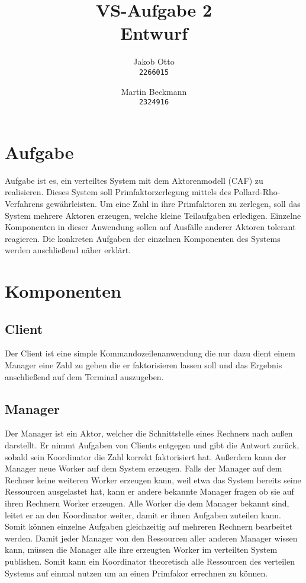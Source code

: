 \documentclass[a4paper, 12pt]{scrartcl}
\author{Jakob Otto\\
	\texttt{2266015} \and Martin Beckmann\\
	\texttt{2324916}}
\title{VS-Aufgabe 2\\
       Entwurf}
\begin{document}
\maketitle
\newpage
	
\section{Aufgabe}
Aufgabe ist es, ein verteiltes System mit dem Aktorenmodell (CAF) zu realisieren. Dieses System soll Primfaktorzerlegung mittels des Pollard-Rho-Verfahrens gewährleisten. Um eine Zahl in ihre Primfaktoren zu zerlegen, soll das System mehrere Aktoren erzeugen, welche kleine Teilaufgaben erledigen. Einzelne Komponenten in dieser Anwendung sollen auf Ausfälle anderer Aktoren tolerant reagieren.
Die konkreten Aufgaben der einzelnen Komponenten des Systems werden anschließend näher erklärt.

\section{Komponenten}
\subsection{Client}
Der Client ist eine simple Kommandozeilenanwendung die nur dazu dient einem Manager eine Zahl zu geben die er faktorisieren lassen soll und das Ergebnis anschließend auf dem Terminal auszugeben.

\subsection{Manager}
Der Manager ist ein Aktor, welcher die Schnittstelle eines Rechners nach außen darstellt. Er nimmt Aufgaben von Clients entgegen und gibt die Antwort zurück, sobald sein Koordinator die Zahl korrekt faktorisiert hat. Außerdem kann der Manager neue Worker auf dem System erzeugen. Falls der Manager auf dem Rechner keine weiteren Worker erzeugen kann, weil etwa das System bereits seine Ressourcen ausgelastet hat, kann er andere bekannte Manager fragen ob sie auf ihren Rechnern Worker erzeugen. Alle Worker die dem Manager bekannt sind, leitet er an den Koordinator weiter, damit er ihnen Aufgaben zuteilen kann. Somit können einzelne Aufgaben gleichzeitig auf mehreren Rechnern bearbeitet werden. Damit jeder Manager von den Ressourcen aller anderen Manager wissen kann, müssen die Manager alle ihre erzeugten Worker im verteilten System publishen. Somit kann ein Koordinator theoretisch alle Ressourcen des verteilen Systems auf einmal nutzen um an einen Primfakor errechnen zu können. 
\end{document}
